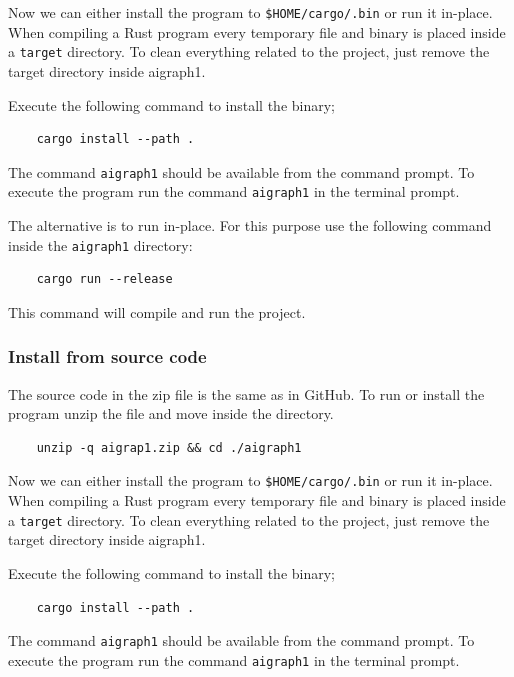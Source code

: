 Now we can either install the program to \texttt{\$HOME/cargo/.bin} or run it in-place. When compiling a
Rust program every temporary file and binary is placed inside a \texttt{target} directory. To clean everything
related to the project, just remove the target directory inside aigraph1.

Execute the following command to install the binary;

\begin{verbatim}
    cargo install --path .
\end{verbatim}

The command \texttt{aigraph1} should be available from the command prompt.
To execute the program run the command \texttt{aigraph1} in the terminal prompt.

The alternative is to run in-place. For this purpose use the following command inside the \texttt{aigraph1} directory:

\begin{verbatim}
    cargo run --release
\end{verbatim}

This command will compile and run the project.

\subsubsection{Install from source code}

The source code in the zip file is the same as in GitHub. To run or install the program unzip the file and move inside the
directory.


\begin{verbatim}
    unzip -q aigrap1.zip && cd ./aigraph1
\end{verbatim}


Now we can either install the program to \texttt{\$HOME/cargo/.bin} or run it in-place. When compiling a
Rust program every temporary file and binary is placed inside a \texttt{target} directory. To clean everything
related to the project, just remove the target directory inside aigraph1.

Execute the following command to install the binary;

\begin{verbatim}
    cargo install --path .
\end{verbatim}

The command \texttt{aigraph1} should be available from the command prompt.
To execute the program run the command \texttt{aigraph1} in the terminal prompt.


